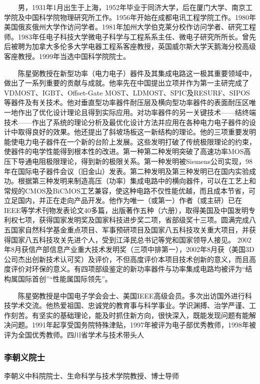 \documentclass[UTF8]{ctexart}
\begin{document}
　　男，1931年1月出生于上海，1952年毕业于同济大学，后在厦门大学、南京工学院及中国科学院物理研究所工作。1956年开始在成都电讯工程学院工作。1980年美国俄亥俄州大学作访问学者。1981年加州大学伯克莱分校作访问学者、研究工程师。1983年任电子科技大学微电子科学与工程系系主任、微电子研究所所长。曾先后被聘为加拿大多伦多大学电器工程系客座教授，英国威尔斯大学天鹅海分校高级客座教授。1999年当选中国科学院院士。

　　陈星弼教授在新型功率（电力电子）器件及其集成电路这一极其重要领域中，做出了一系列重要的贡献与成就。他率先在中国提出立项并作为第一主研完成了VDMOST、IGBT、Offset-Gate MOST、LDMOST、SPIC及RESURF、SIPOS等器件及有关技术。他对垂直型功率器件耐压层及横向型功率器件的表面耐压区唯一地作出了优化设计理论且得到实际应用。对功率器件的另一关键技术——结终端技术——作出了系统的理论分析及最优化设计方法并应用在各种电力电子器件的设计中取得良好的效果。他还提出了斜坡场板这一新结构的理论。他的三项重要发明能使电力电子器件在一个新的台阶上发展。这些发明打破了传统极限理论的约束，使器件的电学性能得到根本性的改进。第一种第二种发明突破了高速功率MOS高压下导通电阻极限理论，得到新的极限关系。第一种发明被Siemens公司实现，98年在国际电子器件会议（旧金山）发表。第二种发明及第三种发明已在国内实验成功。根据第三种发明来制造高压（功率）集成电路中的横向器件，可以在工艺上和常规的CMOS及BiCMOS工艺兼容，使这种电路不仅性能优越，而且成本节省，可立足国内，并正在走向产品开发。他作为唯一（或第一）作者（或主研）已在IEEE等学术刊物发表论文40多篇，出版著作五种（六册），取得美国及中国发明专利权七项，获得国家发明奖及国家科技进步奖二项，省部级奖十三项。圆满完成八五国家自然科学基金重点项目、军事预研项目及国家八五科技攻关重大项目，并获得国家八五科技攻关先进个人，受到江泽民总书记等党和国家领导人接见。 2002年8月获信产部信息产业重大技术发明奖（三项中排第一），2002年8月获（美国3D公司杰出创新技术认可奖）及评价，不但高度评价本项目技术创新的意义，而且高度评价对环保的意义。有四项部级鉴定的新功率器件与功率集成电路均被评为“结构属国际首创”“性能属国际领先”。

　　陈星弼教授是中国电子学会会士、美国IEEE高级会员。多次出访国外进行科技学术交流。他热爱祖国、忠诚党的教育事与科学事业。学识渊搏、治学严谨、工作刻苦。有坚实的基础理论，能及时抓住新方向，很快深入，既能发现问题有能解决问题。1991年起享受国务院特殊津贴，1997年被评为电子部优秀教师，1998年被评为全国优秀教师。四川省学术与技术带头人

    \subsubsection{李朝义院士}
    李朝义中科院院士、生命科学与技术学院教授、博士导师
\end{document}
